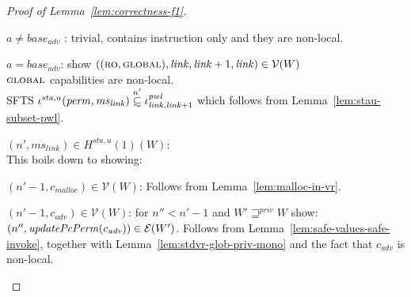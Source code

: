 \documentclass[a4paper]{article}
\newcommand\subsetsim{\mathrel{\ooalign{\raise.2ex\hbox{$\subset$}\cr
      \hidewidth\lower.8ex\hbox{\scalebox{0.9}{$\sim$}}\hidewidth\cr}}}
\newcommand{\nsubsim}[1][n]{\stackrel{\tiny{#1}}{\subsetsim}}
\newcommand{\var}[1]{\mathit{#1}}
\newcommand{\hs}{\var{ms}}
\newcommand{\ms}{\hs}
\newcommand{\start}{\var{base}}
\newcommand{\perm}{\var{perm}}
\newcommand{\adv}{\var{adv}}
\newcommand{\link}{\var{link}}
\newcommand{\pwl}{\var{pwl}}
\newcommand{\sta}{\var{sta}}
\newcommand{\plainfun}[2]{
  \ifthenelse{\equal{#2}{}}
  {\mathit{#1}}
  {\mathit{#1}(#2)}
}
\newcommand{\updatePcPerm}[1]{\plainfun{updatePcPerm}{#1}}
\newcommand{\futurestr}{\mathbin{\sqsupseteq}^{\var{priv}}}
\newcommand{\codelabel}[1]{\mathit{#1}}
\newcommand{\malloc}{\codelabel{malloc}}
\newcommand{\asmType}{\plaindom{AsmType}}
\newcommand{\plaindom}[1]{\mathrm{#1}}
\newcommand{\intr}[2]{\mathcal{#1}}
\newcommand{\valueintr}[1]{\intr{V}{#1}}
\newcommand{\exprintr}[1]{\intr{E}{#1}}
\newcommand{\stdvr}{\valueintr{\asmType}}
\newcommand{\stder}{\exprintr{\asmType}}
\newcommand{\npair}[2][n]{\left(#1,#2 \right)}
\newcommand{\plainperm}[1]{\textsc{#1}}
\newcommand{\readonly}{\plainperm{ro}}
\newcommand{\glob}{\plainperm{global}}
\begin{document}
\begin{proof}[Proof of Lemma~\ref{lem:correctness-f1}]
\begin{enumproof}[resume]
\begin{enumproof}
\begin{enumproof}
        \begin{enumproof}
        \item $a \neq \start_\adv$ : trivial, contains instruction only and they are non-local.
        \item $a = \start_\adv$: show $((\readonly,\glob),\link,\link+1,\link) \in \stdvr(W)$\\
          $\glob$ capabilities are non-local.\\
          SFTS $\iota^{\sta,u}(\perm,\ms_\link) \nsubsim[n'] \iota^\pwl_{\link,\link+1}$ which follows from Lemma~\ref{lem:stau-subset-pwl}.
        \end{enumproof}
      \item $\npair[n']{\ms_\link} \in H^{\sta,u}(1)(W)$:\\
        This boils down to showing:
        \begin{enumproof}
        \item $\npair[n'-1]{c_\malloc} \in \stdvr(W)$: Follows from Lemma~\ref{lem:malloc-in-vr}.

        \item $\npair[n'-1]{c_\adv} \in \stdvr(W)$: for $n'' < n'-1$ and $W'
          \futurestr W$ show: \\$\npair[n'']{\updatePcPerm{c_\adv}} \in
          \stder(W')$. Follows from Lemma~\ref{lem:safe-values-safe-invoke},
          together with Lemma~\ref{lem:stdvr-glob-priv-mono} and the fact that
          $c_\adv$ is non-local.  \label{f1:adv}
        \end{enumproof}


\end{enumproof}
\end{enumproof}
\end{enumproof}
\end{proof}
\end{document}
